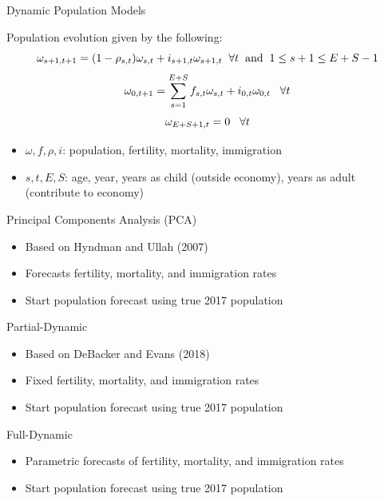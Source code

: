 \documentclass[12pt]{beamer}
\begin{document}
\begin{frame}{Dynamic Population Models}

	Population evolution given by the following:
	\[
		{\omega_{s+1,t+1} = (1 - \rho_{s,t})\omega_{s,t} + i_{s+1,t}\omega_{s+1,t} \hspace{2mm} \forall t \hspace{2mm} \text{and} \hspace{2mm} 1 \leq s+1 \leq E + S - 1}
	\]
	\[
		{\omega_{0,t+1} = \sum_{s=1}^{E+S}f_{s,t}\omega_{s,t} + i_{0,t}\omega_{0,t} \hspace{3mm} \forall t}
	\]
	\[
		\omega_{E+S+1,t}=0 \hspace{3mm} \forall t
	\]
	\begin{itemize}
		\item \(\omega, f, \rho, i\): population, fertility, mortality, immigration
		\item \(s, t, E, S\): age, year, years as child (outside economy), years as adult (contribute to economy)
	\end{itemize}

\end{frame}

\begin{frame}{Principal Components Analysis (PCA)}

	\begin{itemize}
		\item Based on Hyndman and Ullah (2007)
		\item Forecasts fertility, mortality, and immigration rates
		\item Start population forecast using true 2017 population
	\end{itemize}

\end{frame}

\begin{frame}{Partial-Dynamic}

	\begin{itemize}
		\item Based on DeBacker and Evans (2018)
		\item Fixed fertility, mortality, and immigration rates
		\item Start population forecast using true 2017 population
	\end{itemize}

\end{frame}

\begin{frame}{Full-Dynamic}

	\begin{itemize}
		\item Parametric forecasts of fertility, mortality, and immigration rates
		\item Start population forecast using true 2017 population
	\end{itemize}

\end{frame}
\end{document}
